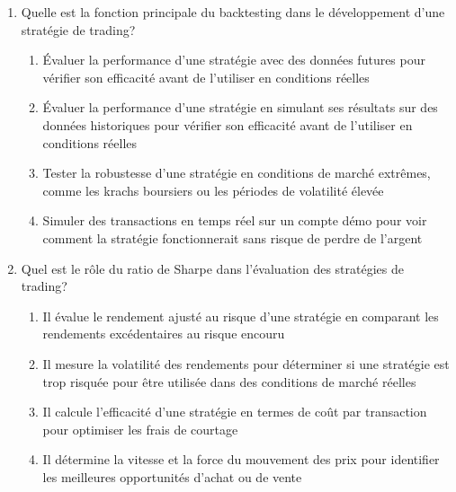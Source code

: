 \documentclass[a4paper,12pt]{article}
\begin{document}
\begin{enumerate}
    \item Quelle est la fonction principale du backtesting dans le développement d'une stratégie de trading?
    \begin{enumerate}[label=(\Alph*)]
        \item Évaluer la performance d'une stratégie avec des données futures pour vérifier son efficacité avant de l'utiliser en conditions réelles
        \item Évaluer la performance d'une stratégie en simulant ses résultats sur des données historiques pour vérifier son efficacité avant de l'utiliser en conditions réelles
        \item Tester la robustesse d'une stratégie en conditions de marché extrêmes, comme les krachs boursiers ou les périodes de volatilité élevée
        \item Simuler des transactions en temps réel sur un compte démo pour voir comment la stratégie fonctionnerait sans risque de perdre de l'argent
    \end{enumerate}

    \item Quel est le rôle du ratio de Sharpe dans l'évaluation des stratégies de trading?
    \begin{enumerate}[label=(\Alph*)]
        \item Il évalue le rendement ajusté au risque d'une stratégie en comparant les rendements excédentaires au risque encouru
        \item Il mesure la volatilité des rendements pour déterminer si une stratégie est trop risquée pour être utilisée dans des conditions de marché réelles
        \item Il calcule l'efficacité d'une stratégie en termes de coût par transaction pour optimiser les frais de courtage
        \item Il détermine la vitesse et la force du mouvement des prix pour identifier les meilleures opportunités d'achat ou de vente
    \end{enumerate}


\end{enumerate}
\end{document}
